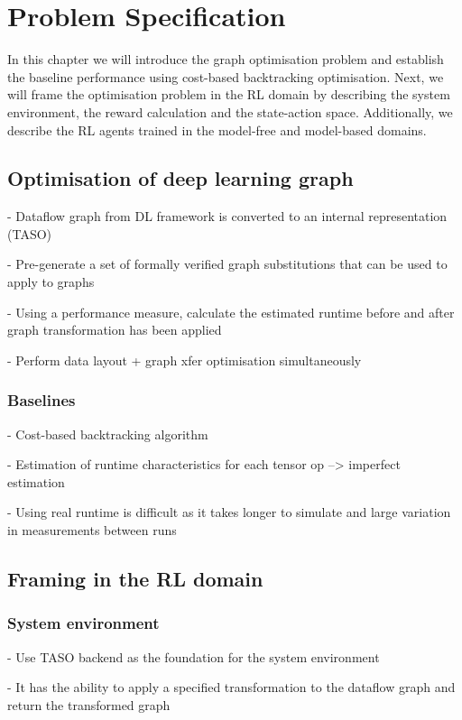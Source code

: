 \chapter{Problem Specification}

In this chapter we will introduce the graph optimisation problem and establish the baseline performance using cost-based backtracking optimisation. Next, we will frame the optimisation problem in the RL domain by describing the system environment, the reward calculation and the state-action space. Additionally, we describe the RL agents trained in the model-free and model-based domains.

\section{Optimisation of deep learning graph}

- Dataflow graph from DL framework is converted to an internal representation (TASO)

- Pre-generate a set of formally verified graph substitutions that can be used to apply to graphs

- Using a performance measure, calculate the estimated runtime before and after graph transformation has been applied

- Perform data layout + graph xfer optimisation simultaneously

\subsection{Baselines}

- Cost-based backtracking algorithm

- Estimation of runtime characteristics for each tensor op --> imperfect estimation

- Using real runtime is difficult as it takes longer to simulate and large variation in measurements between runs

\section{Framing in the RL domain}

\subsection{System environment}

- Use TASO backend as the foundation for the system environment

- It has the ability to apply a specified transformation to the dataflow graph and return the transformed graph

